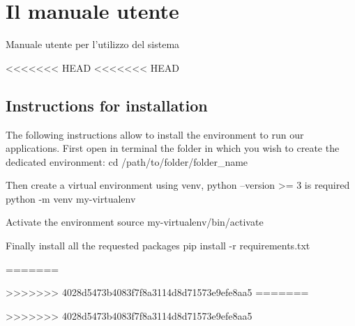 \chapter{Il manuale utente}
\label{appendiceD}
\thispagestyle{empty}

\noindent Manuale utente per l'utilizzo del sistema

<<<<<<< HEAD
<<<<<<< HEAD
\section{Instructions for installation}

The following instructions allow to install the environment to run our applications. 
First open in terminal the folder in which you wish to create the dedicated environment:
cd /path/to/folder/folder_name

Then create a virtual environment using venv, python --version >= 3 is required
python -m venv my-virtualenv

Activate the environment
source my-virtualenv/bin/activate

Finally  install all the requested packages 
pip install -r requirements.txt

=======


\usepackage{color}
>>>>>>> 4028d5473b4083f7f8a3114d8d71573e9efe8aa5
=======


\usepackage{color}
>>>>>>> 4028d5473b4083f7f8a3114d8d71573e9efe8aa5

